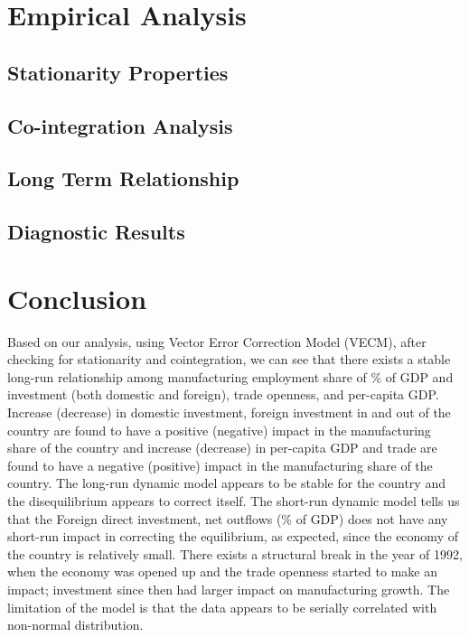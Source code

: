 \documentclass[11pt,a4paper]{article}
\begin{document}
\section{Empirical Analysis}

\subsection{Stationarity Properties}

\subsection{Co-integration Analysis}

\subsection{Long Term Relationship}

\subsection{Diagnostic Results}

\section{Conclusion}

\normalsize Based on our analysis, using Vector Error Correction Model (VECM), after checking for stationarity and cointegration, we can see that there exists a stable long-run relationship among manufacturing employment share of \% of GDP and investment (both domestic and foreign), trade openness, and per-capita GDP.
Increase (decrease) in domestic investment, foreign investment in and out of the country are found to have a positive (negative) impact in the manufacturing share of the country and increase (decrease) in per-capita GDP and trade are found to have a negative (positive) impact in the manufacturing share of the country. The long-run dynamic model appears to be stable for the country and the disequilibrium appears to correct itself. The short-run dynamic model tells us that the Foreign direct investment, net outflows (\% of GDP) does not have any short-run impact in correcting the equilibrium, as expected, since the economy of the country is relatively small. There exists a structural break in the year of 1992, when the economy was opened up and the trade openness started to make an impact; investment since then had larger impact on manufacturing growth. The limitation of the model is that the data appears to be serially correlated with non-normal distribution.  \cite{einstein}
\end{document}
